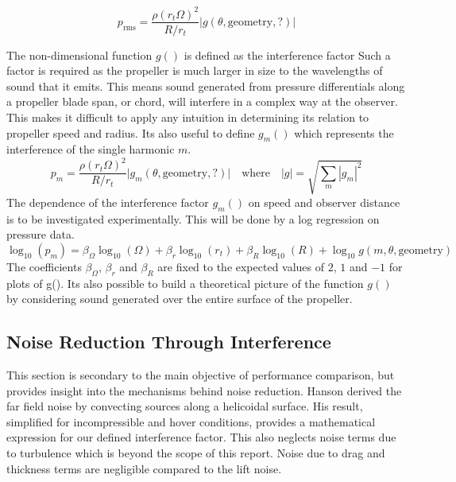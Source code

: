 \documentclass[12pt,a4paper]{article}
\begin{document}
\begin{equation}
    p_\text{rms} = \frac{\rho (r_t \Omega)^2}{R/r_t} \big| g(\theta, \text{geometry}, ?) \big| \label{eq:expected_plaw}
\end{equation}

The non-dimensional function $g()$ is defined as the interference factor %
Such a factor is required as the propeller is much larger in size to the wavelengths of sound that it emits.
This means sound generated from pressure differentials along a propeller blade span, or chord, will interfere in a complex way at the observer.
This makes it difficult to apply any intuition in determining its relation to propeller speed and radius.
Its also useful to define $g_m()$ which represents the interference of the single harmonic $m$.
\begin{equation}
    p_m = \frac{\rho (r_t \Omega)^2}{R/r_t} \big| g_m(\theta, \text{geometry}, ?) \big| \quad \text{where} \quad |g| = \sqrt{\sum_m |g_m|^2 } \label{eq:harminic_plaw}
\end{equation}
The dependence of the interference factor $g_m()$ on speed and observer distance is to be investigated experimentally.
This will be done by a log regression on pressure data.
\begin{equation}
    \log_{10}(p_m) = \beta_\Omega \log_{10}(\Omega) + \beta_r \log_{10}(r_t) +  \beta_R \log_{10}(R) + \log_{10}  g(m, \theta, \text{geometry}) 
\end{equation}
The coefficients $\beta_\Omega$, $\beta_r$ and $\beta_R$ are fixed to the expected values of $2$, $1$ and $-1$ for plots of g().
Its also possible to build a theoretical picture of the function $g()$ by considering sound generated over the entire surface of the propeller.

\subsection{Noise Reduction Through Interference}

This section is secondary to the main objective of performance comparison, but provides insight into the mechanisms behind noise reduction.
Hanson \cite{hanson_theory} derived the far field noise by convecting sources along a helicoidal surface.
His result, simplified for incompressible and hover conditions, provides a mathematical expression for our defined interference factor.
This also neglects noise terms due to turbulence which is beyond the scope of this report.
Noise due to drag and thickness terms are negligible compared to the lift noise.
\end{document}
